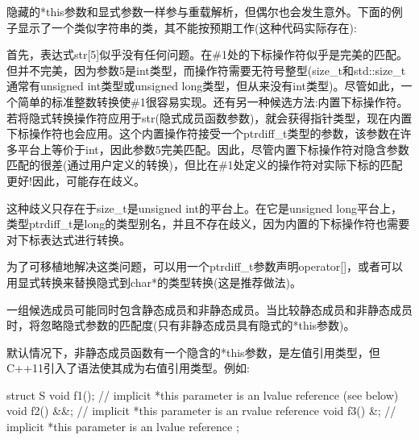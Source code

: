 隐藏的*this参数和显式参数一样参与重载解析，但偶尔也会发生意外。下面的例子显示了一个类似字符串的类，其不能按预期工作(这种代码实际存在):


首先，表达式str[5]似乎没有任何问题。在\#1处的下标操作符似乎是完美的匹配。但并不完美，因为参数5是int类型，而操作符需要无符号整型(size\_t和std::size\_t通常有unsigned int类型或unsigned long类型，但从来没有int类型)。尽管如此，一个简单的标准整数转换使\#1很容易实现。还有另一种候选方法:内置下标操作符。若将隐式转换操作符应用于str(隐式成员函数参数)，就会获得指针类型，现在内置下标操作符也会应用。这个内置操作符接受一个ptrdiff\_t类型的参数，该参数在许多平台上等价于int，因此参数5完美匹配。因此，尽管内置下标操作符对隐含参数匹配的很差(通过用户定义的转换)，但比在\#1处定义的操作符对实际下标的匹配更好!因此，可能存在歧义。

\begin{notice}这种歧义只存在于size\_t是unsigned int的平台上。在它是unsigned long平台上，类型ptrdiff\_t是long的类型别名，并且不存在歧义，因为内置的下标操作符也需要对下标表达式进行转换。
\end{notice}

为了可移植地解决这类问题，可以用一个ptrdiff\_t参数声明operator[]，或者可以用显式转换来替换隐式到char*的类型转换(这是推荐做法)。

一组候选成员可能同时包含静态成员和非静态成员。当比较静态成员和非静态成员时，将忽略隐式参数的匹配度(只有非静态成员具有隐式的*this参数)。

默认情况下，非静态成员函数有一个隐含的*this参数，是左值引用类型，但C++11引入了语法使其成为右值引用类型。例如:

\begin{cpp}
struct S {
	void f1(); // implicit *this parameter is an lvalue reference (see below)
	void f2() &&; // implicit *this parameter is an rvalue reference
	void f3() &; // implicit *this parameter is an lvalue reference
};
\end{cpp}

